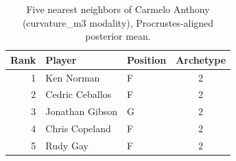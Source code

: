 \begin{table}[htbp]
  \centering\small
  \begin{tabular}{rllc}
    \toprule
    Rank & Player & Position & Archetype \\
    \midrule
    1 & Ken Norman & F & 2 \\
    2 & Cedric Ceballos & F & 2 \\
    3 & Jonathan Gibson & G & 2 \\
    4 & Chris Copeland & F & 2 \\
    5 & Rudy Gay & F & 2 \\
    \bottomrule
  \end{tabular}
  \caption{Five nearest neighbors of Carmelo Anthony (curvature_m3 modality), Procrustes-aligned posterior mean.}
  \label{tab:Carmelo_Anthony_neighbors_curvature_m3}
\end{table}

